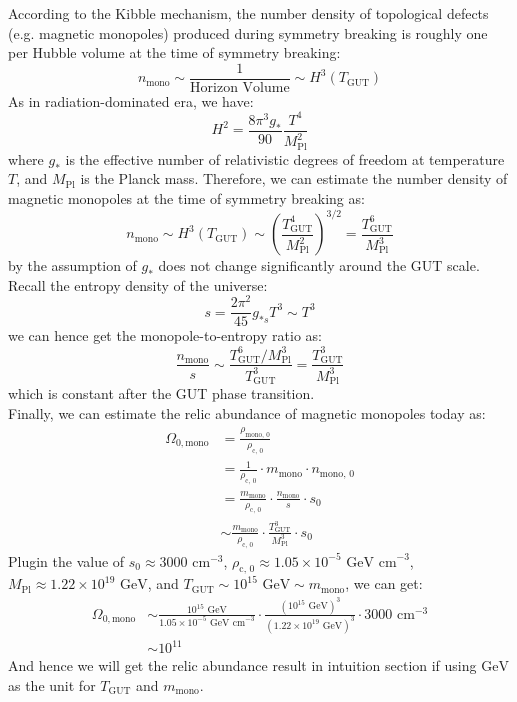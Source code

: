 \bigskip \noindent
\begin{foundation}
    According to the Kibble mechanism, the number density of topological defects (e.g. magnetic monopoles) produced during symmetry breaking is roughly one per Hubble volume at the time of symmetry breaking:
    \[
        n_{\text{mono}} \sim \frac{1}{\text{Horizon Volume}} \sim H^3 (T_{\text{GUT}})
    \]
    As in radiation-dominated era, we have:
    \[
        H^2 = \frac{8 \pi^3 g_*}{90} \frac{T^4}{M_{\text{Pl}}^2}
    \]
    where $g_*$ is the effective number of relativistic degrees of freedom at temperature $T$, and $M_{\text{Pl}}$ is the Planck mass. Therefore, we can estimate the number density of magnetic monopoles at the time of symmetry breaking as:
    \[
        n_{\text{mono}} \sim H^3 (T_{\text{GUT}}) \sim (\frac{T_{\text{GUT}}^4}{M_{\text{Pl}}^2})^{3/2} = \frac{T_{\text{GUT}}^6}{M_{\text{Pl}}^3}
    \]
    by the assumption of $g_*$ does not change significantly around the GUT scale. \\
    
    Recall the entropy density of the universe:
    \[
        s = \frac{2 \pi^2}{45} g_{*s} T^3 \sim T^3
    \]
    we can hence get the monopole-to-entropy ratio as:
    \[
        \frac{n_{\text{mono}}}{s} \sim \frac{T_{\text{GUT}}^6 / M_{\text{Pl}}^3}{T_{\text{GUT}}^3} = \frac{T_{\text{GUT}}^3}{M_{\text{Pl}}^3}
    \]
    which is constant after the GUT phase transition. \\

    Finally, we can estimate the relic abundance of magnetic monopoles today as:
    \begin{align*}
        \Omega_{0, \text{mono}} &= \frac{\rho_{\text{mono, 0}}}{\rho_{\text{c, 0}}} \\
        &= \frac{1}{\rho_{\text{c, 0}}} \cdot m_{\text{mono}} \cdot n_{\text{mono, 0}} \\
        &= \frac{m_{\text{mono}}}{\rho_{\text{c, 0}}} \cdot \frac{n_{\text{mono}}}{s} \cdot s_0 \\
        &\sim \frac{m_{\text{mono}}}{\rho_{\text{c, 0}}} \cdot \frac{T_{\text{GUT}}^3}{M_{\text{Pl}}^3} \cdot s_0
    \end{align*}
    Plugin the value of $s_0 \approx 3000 \text{ cm}^{-3}$, $\rho_{\text{c, 0}} \approx 1.05 \times 10^{-5} \text{ GeV cm}^{-3}$, $M_{\text{Pl}} \approx 1.22 \times 10^{19} \text{ GeV}$, and $T_{\text{GUT}} \sim 10^{15} \text{ GeV} \sim m_{\text{mono}}$, we can get:
    \begin{align*}
        \Omega_{0, \text{mono}} &\sim \frac{10^{15} \text{ GeV}}{1.05 \times 10^{-5} \text{ GeV cm}^{-3}} \cdot \frac{(10^{15} \text{ GeV})^3}{(1.22 \times 10^{19} \text{ GeV})^3} \cdot 3000 \text{ cm}^{-3} \\
        &\sim 10^{11}
    \end{align*}
    And hence we will get the relic abundance result in intuition section if using $\text{GeV}$ as the unit for $T_{\text{GUT}}$ and $m_{\text{mono}}$.
\end{foundation}




